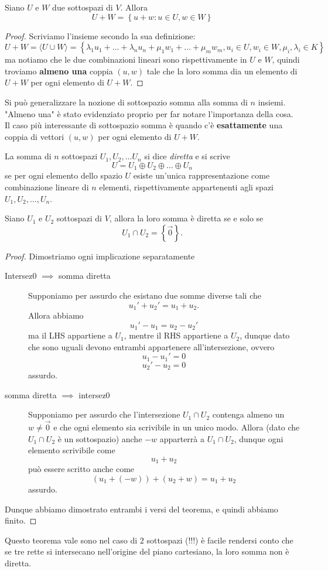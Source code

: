 \documentclass[11pt]{scrartcl}
\begin{document}
	\begin{theorem}
		Siano $U$ e $W$ due sottospazi di $V$. Allora 
		$$U+W=\left\{u+w:u\in U, w\in W\right\}$$
	\end{theorem}
	\begin{proof}
		Scriviamo l'insieme secondo la sua definizione:
		$$U+W=\langle U \cup W\rangle= \left\{\lambda_1u_1+\dots+\lambda_nu_n+\mu_1w_1+\dots+\mu_mw_m,u_i\in U,w_i\in W,\mu_i,\lambda_i\in K\right\}$$
		ma notiamo che le due combinazioni lineari sono rispettivamente in $U$ e $W$, quindi troviamo \textbf{almeno una} coppia $(u,w)$ tale che la loro somma dia un elemento di $U+W$ per ogni elemento di $U+W$.
	\end{proof}
	Si può generalizzare la nozione di sottospazio somma alla somma di $n$ insiemi.
	"Almeno una" è stato evidenziato proprio per far notare l'importanza della cosa. Il caso più interessante di sottospazio somma è quando c'è \textbf{esattamente} una coppia di vettori $(u,w)$ per ogni elemento di $U+W$.
	\begin{definition}
		La somma di $n$ sottospazi $U_1,U_2,\dots U_n$ si dice \textit{diretta} e si scrive
		$$U=U_1\oplus U_2 \oplus \dots \oplus U_n$$
		se per ogni elemento dello spazio $U$ esiste un'unica rappresentazione come combinazione lineare di $n$ elementi, rispettivamente appartenenti agli spazi $U_1,U_2,\dots,U_n$.
	\end{definition}
	\begin{theorem}
		Siano $U_1$ e $U_2$ sottospazi di $V$, allora la loro somma è diretta se e solo se $$U_1\cap U_2=\left\{\vec{0}\right\}.$$
	\end{theorem}
	\begin{proof}
		Dimostriamo ogni implicazione separatamente
		\begin{description}
			\item[Intersez0 $\implies$ somma diretta] Supponiamo per assurdo che esistano due somme diverse tali che
			$$u_1'+u_2'=u_1+u_2.$$
			Allora abbiamo
			$$u_1'-u_1=u_2-u_2'$$
			ma il LHS appartiene a $U_1$, mentre il RHS appartiene a $U_2$, dunque dato che sono uguali devono entrambi appartenere all'intersezione, ovvero
			$$u_1-u_1'=0$$
			$$u_2'-u_2=0$$
			assurdo.
			\item[somma diretta $\implies$ intersez0] Supponiamo per assurdo che l'intersezione $U_1\cap U_2$ contenga almeno un $w\ne \vec{0}$ e che ogni elemento sia scrivibile in un unico modo. Allora (dato che $U_1\cap U_2$ è un sottospazio) anche $-w$ apparterrà a $U_1\cap U_2$, dunque ogni elemento scrivibile come
			$$u_1+u_2$$
			può essere scritto anche come
			$$(u_1+(-w))+(u_2+w)=u_1+u_2$$
			assurdo.
		\end{description}
		Dunque abbiamo dimostrato entrambi i versi del teorema, e quindi abbiamo finito.
	\end{proof}
	Questo teorema vale sono nel caso di $2$ sottospazi (!!!) è facile rendersi conto che se tre rette si intersecano nell'origine del piano cartesiano, la loro somma non è diretta.
	
\end{document}
